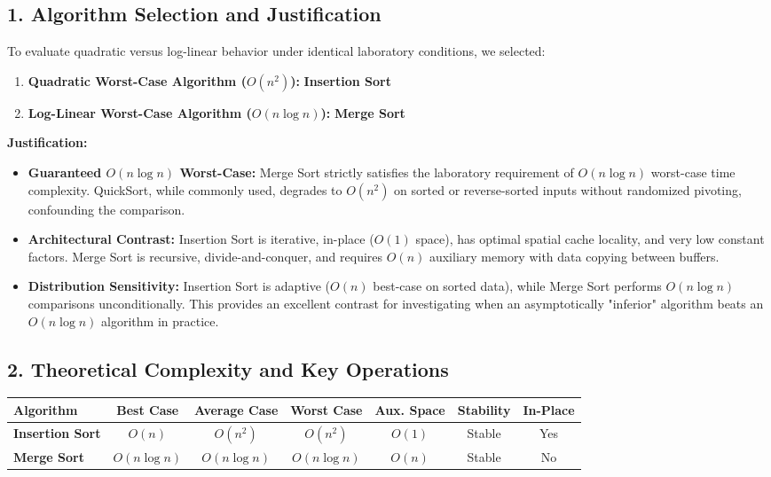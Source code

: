 \documentclass[11pt]{article}
\begin{document}
\subsection*{1. Algorithm Selection and Justification}
To evaluate quadratic versus log-linear behavior under identical laboratory conditions, we selected:
\begin{enumerate}
    \item \textbf{Quadratic Worst-Case Algorithm ($O(n^2)$):} \textbf{Insertion Sort}
    \item \textbf{Log-Linear Worst-Case Algorithm ($O(n \log n)$):} \textbf{Merge Sort}
\end{enumerate}

\noindent\textbf{Justification:}
\begin{itemize}
    \item \textbf{Guaranteed $O(n \log n)$ Worst-Case:} Merge Sort strictly satisfies the laboratory requirement of $O(n \log n)$ worst-case time complexity. QuickSort, while commonly used, degrades to $O(n^2)$ on sorted or reverse-sorted inputs without randomized pivoting, confounding the comparison.
    \item \textbf{Architectural Contrast:} Insertion Sort is iterative, in-place ($O(1)$ space), has optimal spatial cache locality, and very low constant factors. Merge Sort is recursive, divide-and-conquer, and requires $O(n)$ auxiliary memory with data copying between buffers.
    \item \textbf{Distribution Sensitivity:} Insertion Sort is adaptive ($O(n)$ best-case on sorted data), while Merge Sort performs $O(n \log n)$ comparisons unconditionally. This provides an excellent contrast for investigating when an asymptotically "inferior" algorithm beats an $O(n \log n)$ algorithm in practice.
\end{itemize}

\subsection*{2. Theoretical Complexity and Key Operations}

\begin{center}
\small
{}
\vspace{-0.4em}
\begin{tabularx}{0.95\textwidth}{l c c c c c c}
\toprule
\textbf{Algorithm} & \textbf{Best Case} & \textbf{Average Case} & \textbf{Worst Case} & \textbf{Aux. Space} & \textbf{Stability} & \textbf{In-Place} \\
\midrule
\textbf{Insertion Sort} & $O(n)$ & $O(n^2)$ & $O(n^2)$ & $O(1)$ & Stable & Yes \\
\textbf{Merge Sort} & $O(n \log n)$ & $O(n \log n)$ & $O(n \log n)$ & $O(n)$ & Stable & No \\
\bottomrule
\end{tabularx}
\end{center}
\end{document}
